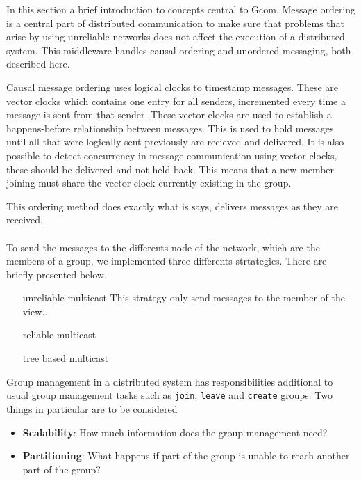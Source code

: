In this section a brief introduction to concepts central to Gcom.
	Message ordering is a central part of distributed communication to make sure that problems that arise by using unreliable networks does not affect the execution of a distributed system.
	This middleware handles causal ordering and unordered messaging, both described here.

		Causal message ordering uses logical clocks to timestamp messages.
		These are vector clocks which contains one entry for all senders, incremented every time a message is sent from that sender.
		These vector clocks are used to establish a happens-before relationship between messages.
		This is used to hold messages until all that were logically sent previously are recieved and delivered.
		It is also possible to detect concurrency in message communication using vector clocks, these should be delivered and not held back.
		This means that a new member joining must share the vector clock currently existing in the group.

		This ordering method does exactly what is says, delivers messages as they are received.


\paragraph{}{
    To send the messages to the differents node of the network,
 which are the members of a group, we implemented three differents
 strtategies. There are briefly presented below.
}

\begin{itemize}
    \item[unreliable multicast] This strategy only send messages
        to the member of the view...
    \item[reliable multicast]
    \item[tree based multicast]


\end{itemize}

	Group management in a distributed system has responsibilities additional to usual group management tasks such as \texttt{join}, \texttt{leave} and \texttt{create} groups.
	Two things in particular are to be considered
	\begin{itemize}
		\item \textbf{Scalability}: How much information does the group management need?
		\item \textbf{Partitioning}: What happens if part of the group is unable to reach another part of the group?
	\end{itemize}

